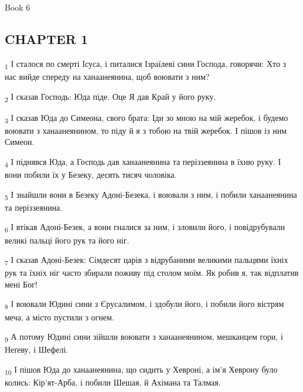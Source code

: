 Book 6
\subsection{CHAPTER 1}
\begin{tcolorbox}
\textsubscript{1} І сталося по смерті Ісуса, і питалися Ізраїлеві сини Господа, говорячи: Хто з нас вийде спереду на ханаанеянина, щоб воювати з ним?
\end{tcolorbox}
\begin{tcolorbox}
\textsubscript{2} І сказав Господь: Юда піде. Оце Я дав Край у його руку.
\end{tcolorbox}
\begin{tcolorbox}
\textsubscript{3} І сказав Юда до Симеона, свого брата: Іди зо мною на мій жеребок, і будемо воювати з ханаанеянином, то піду й я з тобою на твій жеребок. І пішов із ним Симеон.
\end{tcolorbox}
\begin{tcolorbox}
\textsubscript{4} І піднявся Юда, а Господь дав ханаанеянина та періззеянина в їхню руку. І вони побили їх у Безеку, десять тисяч чоловіка.
\end{tcolorbox}
\begin{tcolorbox}
\textsubscript{5} І знайшли вони в Безеку Адоні-Безека, і воювали з ним, і побили ханаанеянина та періззеянина.
\end{tcolorbox}
\begin{tcolorbox}
\textsubscript{6} І втікав Адоні-Безек, а вони гналися за ним, і зловили його, і повідрубували великі пальці його рук та його ніг.
\end{tcolorbox}
\begin{tcolorbox}
\textsubscript{7} І сказав Адоні-Безек: Сімдесят царів з відрубаними великими пальцями їхніх рук та їхніх ніг часто збирали поживу під столом моїм. Як робив я, так відплатив мені Бог!
\end{tcolorbox}
\begin{tcolorbox}
\textsubscript{8} І воювали Юдині сини з Єрусалимом, і здобули його, і побили його вістрям меча, а місто пустили з огнем.
\end{tcolorbox}
\begin{tcolorbox}
\textsubscript{9} А потому Юдині сини зійшли воювати з ханаанеянином, мешканцем гори, і Неґеву, і Шефелі.
\end{tcolorbox}
\begin{tcolorbox}
\textsubscript{10} І пішов Юда до ханаанеянина, що сидить у Хевроні, а ім'я Хеврону було колись: Кір'ят-Арба, і побили Шешая, й Ахімана та Талмая.
\end{tcolorbox}
